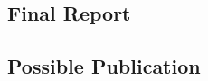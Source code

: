 \documentclass[11pt,fleqn,twoside]{article}
\begin{document}
\subsection{Final Report}

\subsection{Possible Publication}


\nocite{*} %

\newpage
{}

%
%

\renewcommand{\refname}{Annotated Bibliography}  %
\end{document}
